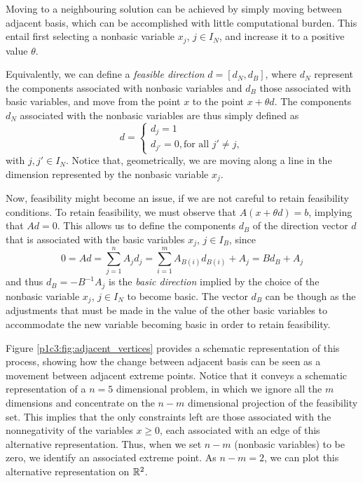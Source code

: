 Moving to a neighbouring solution can be achieved by simply moving between adjacent basis, which can be accomplished  with little computational burden. This entail first selecting a nonbasic variable $x_j$, $j \in I_N$, and increase it to a positive value $\theta$. 

Equivalently, we can define a \emph{feasible direction} $d = [d_N, d_B]$, where $d_N$ represent the components associated with nonbasic variables and $d_B$ those associated with basic variables, and move from the point $x$ to the point $x + \theta d$. The components $d_N$ associated with the nonbasic variables are thus simply defined as 
%
\begin{equation*}
d = \begin{cases} d_j = 1 \\ 
				  d_{j'} = 0, \text{for all } j' \neq j, 
	\end{cases}	
\end{equation*}
%
with $j, j' \in I_N$. Notice that, geometrically, we are moving along a line in the dimension represented by the nonbasic variable $x_j$.

Now, feasibility might become an issue, if we are not careful to retain feasibility conditions. To retain feasibility, we must observe that $A(x + \theta d) = b$, implying that $Ad = 0$. This allows us to define the components $d_B$ of the direction vector $d$ that is associated with the basic variables $x_j$, $j \in I_B$, since
%
\begin{equation*}
	0 = Ad = \sum_{j = 1}^n	A_j d_j = \sum_{i = 1}^m A_{B(i)}d_{B(i)} + A_j = Bd_B + A_j
\end{equation*}
%
and thus $d_B = -B^{-1} A_j$ is the \emph{basic direction} implied by the choice of the nonbasic variable $x_j$, $j \in I_N$ to become basic. The vector $d_B$ can be though as the adjustments that must be made in the value of the other basic variables to accommodate the new variable becoming basic in order to retain feasibility. 


Figure \ref{p1c3:fig:adjacent_vertices} provides a schematic representation of this process, showing how the change between adjacent basis can be seen as a movement between adjacent extreme points. Notice that it conveys a schematic representation of a $n=5$ dimensional problem, in which we ignore all the $m$ dimensions and concentrate on the $n-m$ dimensional projection of the feasibility set. This implies that the only constraints left are those associated with the nonnegativity of the variables $x \ge 0$, each associated with an edge of this alternative representation. Thus, when we set $n-m$ (nonbasic variables) to be zero, we identify an associated extreme point. As $n-m = 2$, we can plot this alternative representation on $\mathbb{R}^2$.

